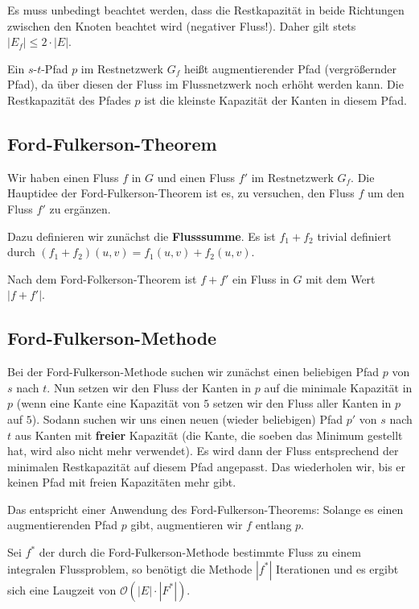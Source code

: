 \documentclass[12pt]{article}
\begin{document}
Es muss unbedingt beachtet werden, dass die Restkapazität in beide Richtungen zwischen den Knoten beachtet wird (negativer Fluss!). Daher gilt stets $|E_f| \leq 2\cdot|E|$.

Ein $s$-$t$-Pfad $p$ im Restnetzwerk $G_f$ heißt augmentierender Pfad (vergrößernder Pfad), da über diesen der Fluss im Flussnetzwerk noch erhöht werden kann. Die Restkapazität des Pfades $p$ ist die kleinste Kapazität der Kanten in diesem Pfad.

\subsection{Ford-Fulkerson-Theorem}

Wir haben einen Fluss $f$ in $G$ und einen Fluss $f'$ im Restnetzwerk $G_f$. Die Hauptidee der Ford-Fulkerson-Theorem ist es, zu versuchen, den Fluss $f$ um den Fluss $f'$ zu ergänzen.

Dazu definieren wir zunächst die \textbf{Flusssumme}. Es ist $f_1 + f_2$ trivial definiert durch $(f_1+f_2)(u,v) = f_1(u,v)+f_2(u,v)$.

Nach dem Ford-Folkerson-Theorem ist $f + f'$ ein Fluss in $G$ mit dem Wert $|f + f'|$.

\subsection{Ford-Fulkerson-Methode}

Bei der Ford-Fulkerson-Methode suchen wir zunächst einen beliebigen Pfad $p$ von $s$ nach $t$. Nun setzen wir den Fluss der Kanten in $p$ auf die minimale Kapazität in $p$ (wenn eine Kante eine Kapazität von $5$ setzen wir den Fluss aller Kanten in $p$ auf $5$). Sodann suchen wir uns einen neuen (wieder beliebigen) Pfad $p'$ von $s$ nach $t$ aus Kanten mit \textbf{freier} Kapazität (die Kante, die soeben das Minimum gestellt hat, wird also nicht mehr verwendet). Es wird dann der Fluss entsprechend der minimalen Restkapazität auf diesem Pfad angepasst. Das wiederholen wir, bis er keinen Pfad mit freien Kapazitäten mehr gibt.

Das entspricht einer Anwendung des Ford-Fulkerson-Theorems: Solange es einen augmentierenden Pfad $p$ gibt, augmentieren wir $f$ entlang $p$.

Sei $f^*$ der durch die Ford-Fulkerson-Methode bestimmte Fluss zu einem integralen Flussproblem, so benötigt die Methode $|f^*|$ Iterationen und es ergibt sich eine Laugzeit von $\mathcal O(|E| \cdot |F^*|)$.
\end{document}

